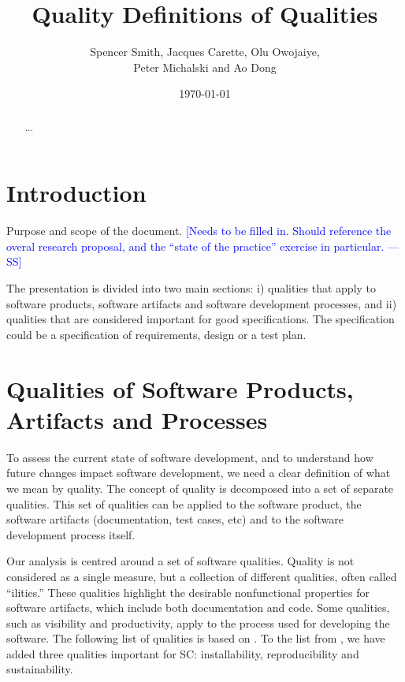 \documentclass[12pt]{article}
\newcommand{\authornote}[3]{\textcolor{#1}{[#3 ---#2]}}
\newcommand{\authornote}[3]{}
\newcommand{\wss}[1]{\authornote{blue}{SS}{#1}} %
\begin{document}
\title{Quality Definitions of Qualities} 
\author{Spencer Smith, Jacques Carette, Olu Owojaiye,\\Peter Michalski and Ao Dong}
\date{\today}
	
\maketitle

\begin{abstract}
  ...
\end{abstract}

\tableofcontents

\newpage

\section{Introduction} \label{SecIntroduction}

Purpose and scope of the document.  \wss{Needs to be filled in.  Should
  reference the overal research proposal, and the ``state of the practice''
  exercise in particular.}

The presentation is divided into two main sections: i) qualities that apply to software products,
software artifacts and software development processes, and ii) qualities that
are considered important for good specifications.  The specification could be a
specification of requirements, design or a test plan.  

\section{Qualities of Software Products, Artifacts and
  Processes} \label{SecQualities}

To assess the current state of software development, and to understand how
future changes impact software development, we need a clear definition of what
we mean by quality.  The concept of quality is decomposed into a set of separate
qualities.  This set of qualities can be applied to the software product, the
software artifacts (documentation, test cases, etc) and to the software
development process itself.

Our analysis is centred around a set of software qualities.  Quality is not
considered as a single measure, but a collection of different qualities, often
called ``ilities.''  These qualities highlight the desirable nonfunctional
properties for software artifacts, which include both documentation and
code. Some qualities, such as visibility and productivity, apply to the process
used for developing the software. The following list of qualities is based on
\cite{GhezziEtAl2003}. To the list from \cite{GhezziEtAl2003}, we have added
three qualities important for SC: installability, reproducibility and
sustainability.
\end{document}

